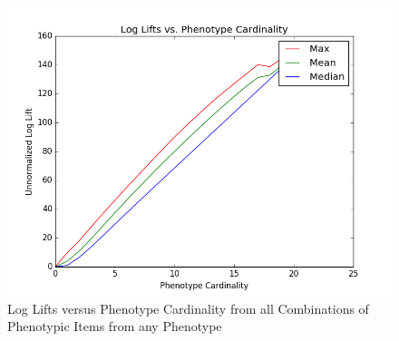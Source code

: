 \documentclass{sig-alternate-05-2015}
\newcommand{\kibitz}[2]{\ifnum\Comments=1\textcolor{#1}{#2}\fi}
\newcommand{\joyce}[1]{\kibitz{purple}      {[Joyce: #1]}}
\newcommand{\jette}[1]{\kibitz{red}      {[Jette: #1]}}
\begin{document}



\begin{figure} [t]
\centering
\includegraphics[width=\linewidth]{logLiftsAcrossPhenoCard_MMM_relabeled.png}
\caption{Log Lifts versus Phenotype Cardinality from all Combinations of Phenotypic Items from any Phenotype}
\label{fig:log-lift}
\end{figure}
\end{document}
